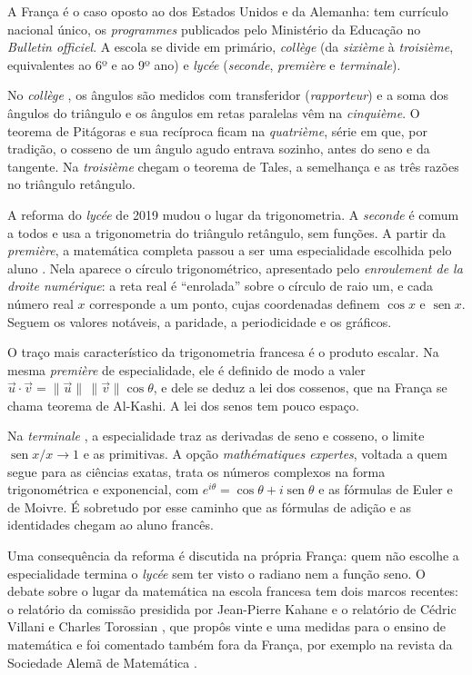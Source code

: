 \documentclass[
    article,
    12pt,
    a4paper,
    sumario=tradicional
]{abntex2}
\begin{document}
A França é o caso oposto ao dos Estados Unidos e da Alemanha: tem currículo
nacional único, os \textit{programmes} publicados pelo Ministério da Educação no
\textit{Bulletin officiel}. A escola se divide em primário, \textit{collège}
(da \textit{sixième} à \textit{troisième}, equivalentes ao 6º e ao 9º ano) e
\textit{lycée} (\textit{seconde}, \textit{première} e \textit{terminale}).

No \textit{collège} \cite{men2015}, os ângulos são medidos com transferidor
(\textit{rapporteur}) e a soma dos ângulos do triângulo e os ângulos em retas
paralelas vêm na \textit{cinquième}. O teorema de Pitágoras e sua recíproca
ficam na \textit{quatrième}, série em que, por tradição, o cosseno de um ângulo
agudo entrava sozinho, antes do seno e da tangente. Na \textit{troisième} chegam o
teorema de Tales, a semelhança e as três razões no triângulo retângulo.

A reforma do \textit{lycée} de 2019 mudou o lugar da trigonometria. A
\textit{seconde} é comum a todos e usa a trigonometria do triângulo retângulo,
sem funções. A partir da \textit{première}, a matemática completa passou a ser
uma especialidade escolhida pelo aluno \cite{men2019a}. Nela aparece o círculo
trigonométrico, apresentado pelo \textit{enroulement de la droite numérique}: a
reta real é ``enrolada'' sobre o círculo de raio um, e cada número real $x$
corresponde a um ponto, cujas coordenadas definem $\cos x$ e $\operatorname{sen} x$.
Seguem os valores notáveis, a paridade, a periodicidade e os gráficos.

O traço mais característico da trigonometria francesa é o produto escalar. Na
mesma \textit{première} de especialidade, ele é definido de modo a valer
$\vec u \cdot \vec v = \lVert \vec u\rVert\,\lVert \vec v\rVert\cos\theta$, e
dele se deduz a lei dos cossenos, que na França se chama teorema de Al-Kashi.
A lei dos senos tem pouco espaço.

Na \textit{terminale} \cite{men2019b}, a especialidade traz as derivadas de seno
e cosseno, o limite $\operatorname{sen}x/x \to 1$ e as primitivas. A opção
\textit{mathématiques expertes}, voltada a quem segue para as ciências exatas,
trata os números complexos na forma trigonométrica e exponencial, com
$e^{i\theta} = \cos\theta + i\operatorname{sen}\theta$ e as fórmulas de Euler e de
Moivre. É sobretudo por esse caminho que as fórmulas de adição e as identidades
chegam ao aluno francês.

Uma consequência da reforma é discutida na própria França: quem não escolhe a
especialidade termina o \textit{lycée} sem ter visto o radiano nem a função
seno. O debate sobre o lugar da matemática na escola francesa tem dois marcos
recentes: o relatório da comissão presidida por Jean-Pierre Kahane
\cite{kahane2002} e o relatório de Cédric Villani e Charles Torossian
\cite{villani2018}, que propôs vinte e uma medidas para o ensino de
matemática e foi comentado também fora da França, por exemplo na revista da
Sociedade Alemã de Matemática \cite{agricola2018}.
\end{document}
